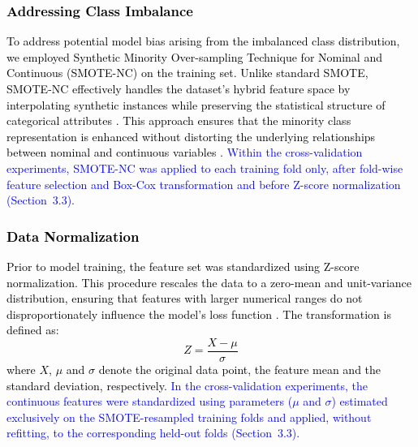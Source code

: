 \documentclass[a4paper,fleqn]{cas-sc}
\begin{document}
\subsubsection{\textcolor{black}{Addressing Class Imbalance}}
\textcolor{black}{To address potential model bias arising from the imbalanced class distribution, we employed Synthetic Minority Over-sampling Technique for Nominal and Continuous (SMOTE-NC) on the training set. Unlike standard SMOTE, SMOTE-NC effectively handles the dataset's hybrid feature space by interpolating synthetic instances while preserving the statistical structure of categorical attributes \cite{Chawla2002}. This approach ensures that the minority class representation is enhanced without distorting the underlying relationships between nominal and continuous variables \cite{Batista2004}. \textcolor{blue}{Within the cross-validation experiments, SMOTE-NC was applied to each training fold only, after fold-wise feature selection and Box-Cox transformation and before Z-score normalization (Section~3.3).}}

\subsubsection{\textcolor{black}{Data Normalization}}
\textcolor{black}{Prior to model training, the feature set was standardized using Z-score normalization. This procedure rescales the data to a zero-mean and unit-variance distribution, ensuring that features with larger numerical ranges do not disproportionately influence the model's loss function \cite{Iglewicz1993}. The transformation is defined as:\begin{equation}Z = \frac{X-\mu}{\sigma} \label{eq:eq5}\end{equation}where $X$, $\mu$ and $\sigma$ denote the original data point, the feature mean and the standard deviation, respectively. \textcolor{blue}{In the cross-validation experiments, the continuous features were standardized using parameters ($\mu$ and $\sigma$) estimated exclusively on the SMOTE-resampled training folds and applied, without refitting, to the corresponding held-out folds (Section~3.3).}}
\end{document}
